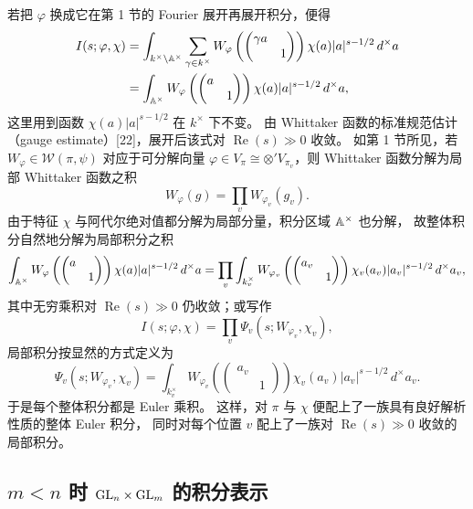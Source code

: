 若把 $\varphi$ 换成它在第 1 节的 Fourier 展开再展开积分，便得
\[
\begin{aligned}
I(s;\varphi,\chi)&=\int_{k^\times\backslash\mathbb{A}^\times}
\sum_{\gamma\in k^\times}W_\varphi\left(\begin{pmatrix}\gamma a&\\&1\end{pmatrix}\right)
\chi(a)|a|^{s-1/2}\,d^\times a\\
&=\int_{\mathbb{A}^\times}W_\varphi\left(\begin{pmatrix}a&\\&1\end{pmatrix}\right)
\chi(a)|a|^{s-1/2}\,d^\times a,
\end{aligned}
\]
这里用到函数 $\chi(a)|a|^{s-1/2}$ 在 $k^\times$ 下不变。
由 Whittaker 函数的标准规范估计（gauge estimate）[22]，展开后该式对
$\operatorname{Re}(s)\gg0$ 收敛。
如第 1 节所见，若 $W_\varphi\in\mathcal{W}(\pi,\psi)$ 对应于可分解向量
$\varphi\in V_\pi\cong\otimes'V_{\pi_v}$，则 Whittaker 函数分解为局部
Whittaker 函数之积
\[
W_\varphi(g)=\prod_v W_{\varphi_v}(g_v).
\]
由于特征 $\chi$ 与阿代尔绝对值都分解为局部分量，积分区域 $\mathbb{A}^\times$ 也分解，
故整体积分自然地分解为局部积分之积
\[
\int_{\mathbb{A}^\times}W_\varphi\left(\begin{pmatrix}a&\\&1\end{pmatrix}\right)\chi(a)|a|^{s-1/2}\,d^\times a
=\prod_v\int_{k_v^\times}W_{\varphi_v}\left(\begin{pmatrix}a_v&\\&1\end{pmatrix}\right)
\chi_v(a_v)|a_v|^{s-1/2}\,d^\times a_v,
\]
其中无穷乘积对 $\operatorname{Re}(s)\gg0$ 仍收敛；或写作
\[
I(s;\varphi,\chi)=\prod_v\Psi_v(s;W_{\varphi_v},\chi_v),
\]
局部积分按显然的方式定义为
\[
\Psi_v(s;W_{\varphi_v},\chi_v)=\int_{k_v^\times}
W_{\varphi_v}\left(\begin{pmatrix}a_v&\\&1\end{pmatrix}\right)
\chi_v(a_v)|a_v|^{s-1/2}\,d^\times a_v.
\]
于是每个整体积分都是 Euler 乘积。
这样，对 $\pi$ 与 $\chi$ 便配上了一族具有良好解析性质的整体 Euler 积分，
同时对每个位置 $v$ 配上了一族对 $\operatorname{Re}(s)\gg0$ 收敛的局部积分。

\subsection{$m<n$ 时 $\mathrm{GL}_n\times\mathrm{GL}_m$ 的积分表示}

